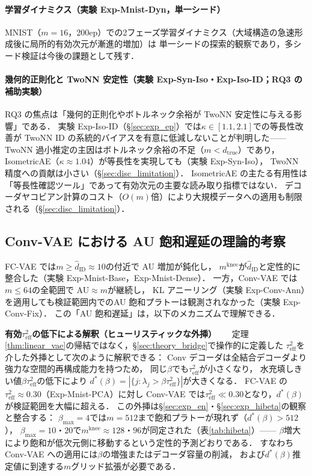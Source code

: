 \documentclass[11pt,a4paper]{jsarticle}
\newcommand{\kap}{\kappa}
\newcommand{\mknee}{m^{\mathrm{knee}}}
\begin{document}
\paragraph{学習ダイナミクス（実験 Exp-Mnist-Dyn，単一シード）}
MNIST（$m=16$，200ep）での2フェーズ学習ダイナミクス（大域構造の急速形成後に局所的有効次元が漸進的増加）は
単一シードの探索的観察であり，多シード検証は今後の課題として残す．

\paragraph{幾何的正則化と TwoNN 安定性（実験 Exp-Syn-Iso・Exp-Iso-ID；RQ3 の補助実験）}
RQ3 の焦点は「幾何的正則化やボトルネック余裕が TwoNN 安定性に与える影響」である．
実験 Exp-Iso-ID（§\ref{sec:exp_ep}）では$\kap \in [1.1, 2.1]$での等長性改善が
TwoNN ID の系統的バイアスを有意に低減しないことが判明した——
TwoNN 過小推定の主因はボトルネック余裕の不足（$m < d_\mathrm{true}$）であり，
IsometricAE（$\kap \approx 1.04$）が等長性を実現しても（実験 Exp-Syn-Iso），
TwoNN 精度への貢献は小さい（§\ref{sec:disc_limitation}）．
IsometricAE の主たる有用性は「等長性確認ツール」であって有効次元の主要な読み取り指標ではない．
デコーダヤコビアン計算のコスト（$O(m)$倍）により大規模データへの適用も制限される（§\ref{sec:disc_limitation}）．

\subsection{Conv-VAE における AU 飽和遅延の理論的考察}\label{sec:disc_convvae}

FC-VAE では$m \geq \hat{d}_\mathrm{ID} \approx 10$の付近で AU 増加が鈍化し，
$\mknee$が$\hat{d}_\mathrm{ID}$と定性的に整合した（実験 Exp-Mnist-Base，Exp-Mnist-Dense）．
一方，Conv-VAE では$m \leq 64$の全範囲で AU$\approx m$が継続し，
KL アニーリング（実験 Exp-Conv-Ann）を適用しても検証範囲内でのAU 飽和プラトーは観測されなかった（実験 Exp-Conv-Fix）．
この「AU 飽和遅延」は，以下のメカニズムで理解できる．

\textbf{有効$\tau^2_\mathrm{eff}$の低下による解釈（ヒューリスティックな外挿）}~~~
定理\ref{thm:linear_vae}の帰結ではなく，§\ref{sec:theory_bridge}で操作的に定義した
$\tau^2_\mathrm{eff}$を介した外挿として次のように解釈できる：
Conv デコーダは全結合デコーダより強力な空間的再構成能力を持つため，
同じ$\beta$でも$\tau^2_\mathrm{eff}$が小さくなり，
水充填しきい値$\beta\tau^2_\mathrm{eff}$の低下により
$d^*(\beta) = |\{j : \lambda_j > \beta\tau^2_\mathrm{eff}\}|$が大きくなる．
FC-VAE の$\tau^2_\mathrm{eff} \approx 0.30$（Exp-Mnist-PCA）に対し
Conv-VAE では$\tau^2_\mathrm{eff} \ll 0.30$となり，$d^*(\beta)$が検証範囲を大幅に超える．
この外挿は§\ref{sec:exp_en}・§\ref{sec:exp_hibeta}の観察と整合する：
$\beta_{\max}=4$では$m=512$まで飽和プラトーが現れず（$d^*(\beta) > 512$），
$\beta_{\max}=10$・$20$で$\mknee \approx 128$・$96$が同定された（表\ref{tab:hibeta}）——
$\beta$増大により飽和が低次元側に移動するという定性的予測どおりである．
すなわち Conv-VAE への適用には$\beta$の増強またはデコーダ容量の削減，
および$d^*(\beta)$推定値に到達する$m$グリッド拡張が必要である．
\end{document}

